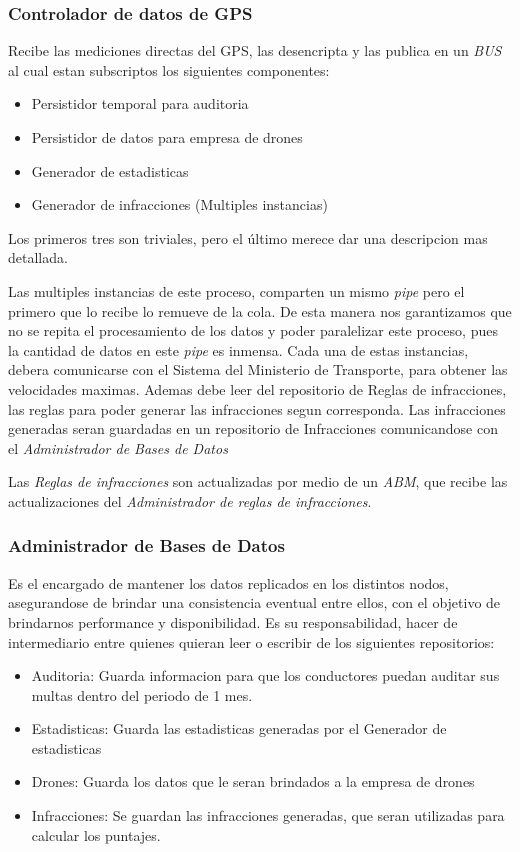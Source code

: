 \subsubsection{Controlador de datos de GPS}

Recibe las mediciones directas del GPS, las desencripta y las publica en un \textit{BUS} 
al cual estan subscriptos los siguientes componentes:

\begin{itemize}
  \item Persistidor temporal para auditoria
  \item Persistidor de datos para empresa de drones
  \item Generador de estadisticas
  \item Generador de infracciones (Multiples instancias)
\end{itemize}

Los primeros tres son triviales, pero el último merece dar una descripcion mas 
detallada.

Las multiples instancias de este proceso, comparten un mismo \textit{pipe} pero 
el primero que lo recibe lo remueve de la cola. De esta manera nos garantizamos 
que no se repita el procesamiento de los datos y poder paralelizar este 
proceso, pues la cantidad de datos en este \textit{pipe} es inmensa.
Cada una de estas instancias, debera comunicarse con el Sistema del Ministerio 
de Transporte, para obtener las velocidades maximas. Ademas debe leer del 
repositorio de Reglas de infracciones, las reglas para poder generar las 
infracciones segun corresponda.
Las infracciones generadas seran guardadas en un repositorio de Infracciones 
comunicandose con el \textit{Administrador de Bases de Datos}

Las \textit{Reglas de infracciones} son actualizadas por medio de un 
\textit{ABM}, que recibe las actualizaciones del \textit{Administrador de reglas de 
infracciones}.


\subsubsection{Administrador de Bases de Datos}
Es el encargado de mantener los datos replicados en los distintos nodos, 
asegurandose de brindar una consistencia eventual entre ellos, con el objetivo 
de brindarnos performance y disponibilidad.
Es su responsabilidad, hacer de intermediario entre quienes quieran leer o 
escribir de los siguientes repositorios:

\begin{itemize}
  \item Auditoria: Guarda informacion para que los conductores puedan auditar 
  sus multas dentro del periodo de 1 mes.
  \item Estadisticas: Guarda las estadisticas generadas por el Generador de estadisticas
  \item Drones: Guarda los datos que le seran brindados a la empresa de drones
  \item Infracciones: Se guardan las infracciones generadas, que seran utilizadas 
  para calcular los puntajes.
\end{itemize}


